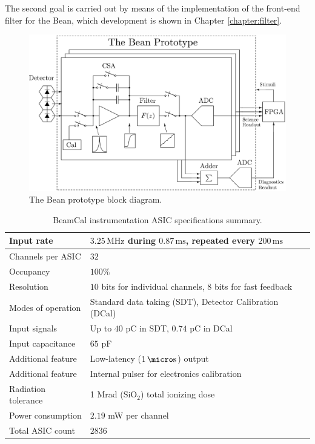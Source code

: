 The second goal is carried out by means of the implementation of the front-end filter for the Bean, which development is shown in Chapter \ref{chapter:filter}.

\begin{figure}[!t]
	\centering
	\includegraphics[width=5.3in]{./Figures/thebean_diag.eps}
	\caption{The Bean prototype block diagram.}\label{fig:bean_diag}
\end{figure}

\begin{table}[!t]
	\begin{center}
		\begin{tabular}{|l|l|}\hline
			Input rate & $3.25\,\text{MHz}$ during $0.87\,\text{ms}$, repeated every $200\,\text{ms}$ \\ \hline
			Channels per ASIC & $32$ \\ \hline
			Occupancy & $100\%$ \\ \hline
			Resolution & $10$ bits for individual channels, $8$ bits for fast feedback \\ \hline
			Modes of operation & Standard data taking (SDT), Detector Calibration (DCal) \\ \hline
			Input signals & Up to $40$ pC in SDT, $0.74$ pC in DCal \\ \hline
			Input capacitance & $65$ pF \\ \hline
			Additional feature & Low-latency ($1\,\micro\text{s}$) output \\ \hline
			Additional feature & Internal pulser for electronics calibration \\ \hline
			Radiation tolerance & 1 Mrad ($\text{SiO}_2$) total ionizing dose \\ \hline
			Power consumption & $2.19$ mW per channel \\ \hline
			Total ASIC count & $2836$ \\\hline
		\end{tabular}
		\vspace*{5pt}
		\caption{BeamCal instrumentation ASIC specifications summary.}\label{tab:bean_specs}
	\end{center}
\end{table}